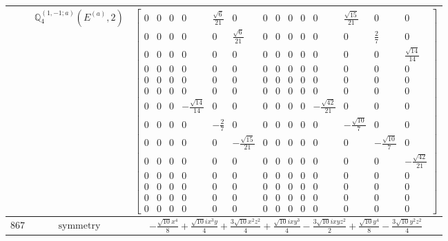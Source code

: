 \documentclass[fleqn,8pt,landscape]{jsarticle}
\begin{document}
\begin{longtable}{ccc}
$  $ & $ \mathbb{Q}_{4}^{(1,-1;a)}(E^{(a)},2) $ & $ \begin{bmatrix} 0 & 0 & 0 & 0 & \frac{\sqrt{6}}{21} & 0 & 0 & 0 & 0 & 0 & 0 & \frac{\sqrt{15}}{21} & 0 & 0 \\ 0 & 0 & 0 & 0 & 0 & \frac{\sqrt{6}}{21} & 0 & 0 & 0 & 0 & 0 & 0 & \frac{2}{7} & 0 \\ 0 & 0 & 0 & 0 & 0 & 0 & 0 & 0 & 0 & 0 & 0 & 0 & 0 & \frac{\sqrt{14}}{14} \\ 0 & 0 & 0 & 0 & 0 & 0 & 0 & 0 & 0 & 0 & 0 & 0 & 0 & 0 \\ 0 & 0 & 0 & 0 & 0 & 0 & 0 & 0 & 0 & 0 & 0 & 0 & 0 & 0 \\ 0 & 0 & 0 & 0 & 0 & 0 & 0 & 0 & 0 & 0 & 0 & 0 & 0 & 0 \\ 0 & 0 & 0 & - \frac{\sqrt{14}}{14} & 0 & 0 & 0 & 0 & 0 & 0 & - \frac{\sqrt{42}}{21} & 0 & 0 & 0 \\ 0 & 0 & 0 & 0 & - \frac{2}{7} & 0 & 0 & 0 & 0 & 0 & 0 & - \frac{\sqrt{10}}{7} & 0 & 0 \\ 0 & 0 & 0 & 0 & 0 & - \frac{\sqrt{15}}{21} & 0 & 0 & 0 & 0 & 0 & 0 & - \frac{\sqrt{10}}{7} & 0 \\ 0 & 0 & 0 & 0 & 0 & 0 & 0 & 0 & 0 & 0 & 0 & 0 & 0 & - \frac{\sqrt{42}}{21} \\ 0 & 0 & 0 & 0 & 0 & 0 & 0 & 0 & 0 & 0 & 0 & 0 & 0 & 0 \\ 0 & 0 & 0 & 0 & 0 & 0 & 0 & 0 & 0 & 0 & 0 & 0 & 0 & 0 \\ 0 & 0 & 0 & 0 & 0 & 0 & 0 & 0 & 0 & 0 & 0 & 0 & 0 & 0 \\ 0 & 0 & 0 & 0 & 0 & 0 & 0 & 0 & 0 & 0 & 0 & 0 & 0 & 0 \end{bmatrix} $ \\ \hline
$ 867 $ & $ \text{symmetry} $ & $ - \frac{\sqrt{10} x^{4}}{8} + \frac{\sqrt{10} i x^{3} y}{4} + \frac{3 \sqrt{10} x^{2} z^{2}}{4} + \frac{\sqrt{10} i x y^{3}}{4} - \frac{3 \sqrt{10} i x y z^{2}}{2} + \frac{\sqrt{10} y^{4}}{8} - \frac{3 \sqrt{10} y^{2} z^{2}}{4} $ \\

\end{longtable}
\end{document}
